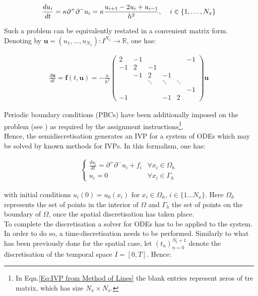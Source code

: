 \documentclass[11pt]{article}
\theoremstyle{theorem}
\theoremstyle{definition}
\begin{document}
\begin{align*}
	\frac{du_i}{dt} = \kappa \partial^+\partial^- u_i = \kappa\frac{u_{i+1} - 2u_i + u_{i-1}}{h^2},\hspace{4mm} i\in\lbrace 1,\ldots, N_x\rbrace
\end{align*}

Such a problem can be equivalently restated in a convenient matrix form. Denoting by $ \mathbf{u} = (u_1,\ldots,u_{N_x}) : I^{N_x} \to \mathbb{R} $, one has:

\begin{align}\label{Eq:IVP from Method of Lines}
\frac{d\mathbf{u}}{dt} = \mathbf{f}(t,\mathbf{u}) = -\frac{\kappa}{h^2}
\begin{pmatrix}
2 & -1 & & & & -1\\
-1 & 2 & -1 & & & \\
& -1 & 2 & -1 & & \\
& & \ddots & \ddots & \ddots & \\
& & & & & -1 \\
-1 & & & -1 & 2
\end{pmatrix}
\mathbf{u} 
\end{align}

Periodic boundary conditions (PBCs) have been additionally imposed on the problem (see \cite{lec-notes}) as required by the assignment instructions\footnote{In Eqn.\eqref{Eq:IVP from Method of Lines} the blank entries represent zeros of tre matrix, which has size $N_x\times N_x$.}.\\
Hence, the semidiscretisation generates an IVP for a system of ODEs which may be solved by known methods for IVPs. In this formalism, one has:


\begin{align}
\label{eqn:lines}
\begin{cases}
	\frac{du_i}{dt}=\partial^+\partial^-u_i+f_i &\forall x_i\in\Omega_h\\
	u_i=0 &\forall x_i\in\Gamma_h
\end{cases}
\end{align} 

with initial conditions $u_i(0)=u_0(x_i)$ for $x_i\in\Omega_h$, $i\in\lbrace 1\ldots N_x\rbrace$. Here $\Omega_h$ represents the set of points in the interior of $\Omega$ and $\Gamma_h$ the set of points on the boundary of $\Omega$, once the spatial discretisation has taken place.\\
To complete the discretisation a solver for ODEs has to be applied to the system. In order to do so, a time-discretisation needs to be performed. Similarly to what has been previously done for the spatial case, let $ (t_n)_{n = 0}^{N_t + 1} $ denote the discretisation of the temporal space $ I = [0,T] $. Hence:
\end{document}
